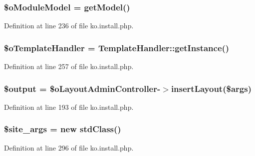 \subsubsection[{\$o\+Module\+Model}]{\setlength{\rightskip}{0pt plus 5cm}\$o\+Module\+Model = {\bf get\+Model}(\textquotesingle{})}\label{ko_8install_8php_a8d7a87df524e7d6938f66f8e284cdd1e}


Definition at line 236 of file ko.\+install.\+php.

\hypertarget{ko_8install_8php_abd57e3ab220291ea9b5c16c2a4e0670e}{}
\subsubsection[{\$o\+Template\+Handler}]{\setlength{\rightskip}{0pt plus 5cm}\$o\+Template\+Handler = {\bf Template\+Handler\+::get\+Instance}()}\label{ko_8install_8php_abd57e3ab220291ea9b5c16c2a4e0670e}


Definition at line 257 of file ko.\+install.\+php.

\hypertarget{ko_8install_8php_a73004ce9cd673c1bfafd1dc351134797}{}
\subsubsection[{\$output}]{\setlength{\rightskip}{0pt plus 5cm}\$output = \$o\+Layout\+Admin\+Controller-\/$>$insert\+Layout(\$args)}\label{ko_8install_8php_a73004ce9cd673c1bfafd1dc351134797}


Definition at line 193 of file ko.\+install.\+php.

\hypertarget{ko_8install_8php_a19e0fcfacd69155c9cc255e5500f6ccc}{}
\subsubsection[{\$site\+\_\+args}]{\setlength{\rightskip}{0pt plus 5cm}\$site\+\_\+args = new std\+Class()}\label{ko_8install_8php_a19e0fcfacd69155c9cc255e5500f6ccc}


Definition at line 296 of file ko.\+install.\+php.

